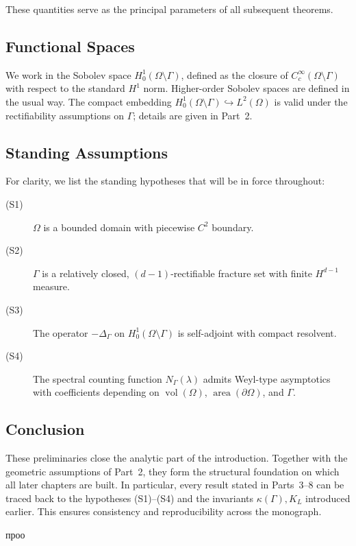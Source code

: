 These quantities serve as the principal parameters of all subsequent theorems.

\subsection{Functional Spaces}

We work in the Sobolev space $H^1_0(\Omega \setminus \Gamma)$, defined as the
closure of $C_c^\infty(\Omega \setminus \Gamma)$ with respect to the standard
$H^1$ norm. Higher-order Sobolev spaces are defined in the usual way. The
compact embedding $H^1_0(\Omega \setminus \Gamma) \hookrightarrow L^2(\Omega)$
is valid under the rectifiability assumptions on $\Gamma$; details are given in
Part~2.

\subsection{Standing Assumptions}

For clarity, we list the standing hypotheses that will be in force throughout:

\begin{description}
  \item[(S1)] $\Omega$ is a bounded domain with piecewise $C^2$ boundary.
  \item[(S2)] $\Gamma$ is a relatively closed, $(d-1)$-rectifiable fracture set
  with finite $H^{d-1}$ measure.
  \item[(S3)] The operator $-\Delta_\Gamma$ on $H^1_0(\Omega \setminus \Gamma)$
  is self-adjoint with compact resolvent.
  \item[(S4)] The spectral counting function $N_\Gamma(\lambda)$ admits Weyl-type
  asymptotics with coefficients depending on $\operatorname{vol}(\Omega)$,
  $\operatorname{area}(\partial\Omega)$, and $\Gamma$.
\end{description}

\subsection{Conclusion}

These preliminaries close the analytic part of the introduction. Together with
the geometric assumptions of Part~2, they form the structural foundation on
which all later chapters are built. In particular, every result stated in
Parts~3–8 can be traced back to the hypotheses (S1)–(S4) and the invariants
$\kappa(\Gamma), K_L$ introduced earlier. This ensures consistency and
reproducibility across the monograph.

проо
